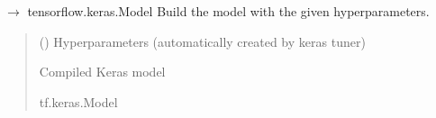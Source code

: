 \documentclass[letterpaper,10pt,english]{sphinxmanual}
\begin{document}

\begin{fulllineitems}
\label{\detokenize{autoapi/src/LSTMTrainer/index:src.LSTMTrainer.__build_model}}
\pysigstartsignatures
\pysiglinewithargsret
{}
{}
{{ $\rightarrow$ tensorflow.keras.Model}}
\pysigstopsignatures
\sphinxAtStartPar
Build the model with the given hyperparameters.
\begin{quote}\begin{description}
\sphinxAtStartPar
{} () \textendash{} Hyperparameters (automatically created by keras tuner)

\sphinxAtStartPar
Compiled Keras model

\sphinxAtStartPar
tf.keras.Model

\end{description}\end{quote}

\end{fulllineitems}

\end{document}
